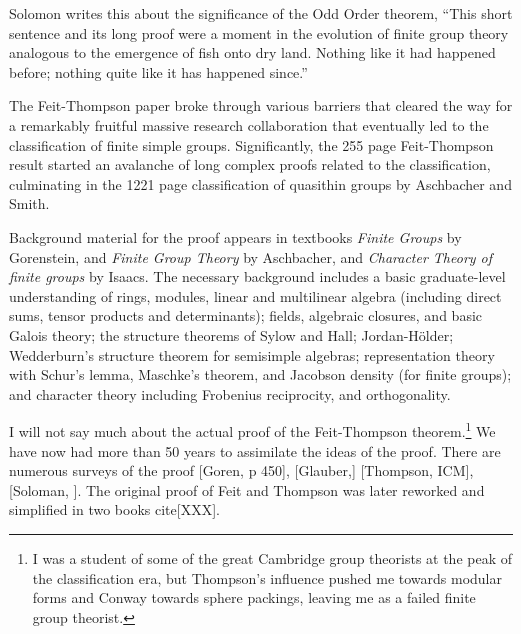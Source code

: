 \documentclass[brochure,english,12pt]{bourbaki}
\theoremstyle{plain}
\begin{document}
Solomon writes this about the significance of the Odd Order theorem, ``This short sentence and its long proof
were a moment in the evolution of finite group theory analogous to the emergence of fish onto dry
land.  Nothing like it had happened before; nothing quite like it has happened since.''

The Feit-Thompson paper broke through various barriers that cleared the way for a 
remarkably fruitful massive research collaboration that eventually led to the classification
of finite simple groups.  Significantly, the  255 page Feit-Thompson result
started an avalanche of long complex proofs related to the classification, 
culminating in the 1221 page classification of quasithin groups by Aschbacher and Smith.


Background material for the proof appears in
textbooks {\it Finite Groups} by Gorenstein, and {\it Finite  Group Theory} by Aschbacher, and 
{\it Character Theory of finite groups} by Isaacs.
The necessary background includes a basic graduate-level understanding of rings, modules, linear and multilinear algebra (including 
direct sums, tensor
products  and determinants);
fields, algebraic closures, and basic Galois theory; the structure theorems of Sylow and Hall; Jordan-H\"older;
Wedderburn's structure theorem for semisimple algebras; representation theory with Schur's lemma, Maschke's theorem,
and Jacobson density (for finite groups); and character theory including Frobenius reciprocity, and orthogonality. 

I will not say much about the actual proof of the 
Feit-Thompson theorem.\footnote{I was a student of some of the great Cambridge group theorists at the peak of
the classification era, but Thompson's influence pushed me towards modular forms and Conway towards sphere packings,
leaving me as a failed finite group theorist.}  We have now had
more than 
50 years to assimilate the ideas of the proof.  There are numerous surveys of the proof [Goren, p 450], [Glauber,] [Thompson, ICM],
[Soloman, ].
The original proof of Feit and Thompson was later reworked  and simplified in two books cite[XXX].
\end{document}
